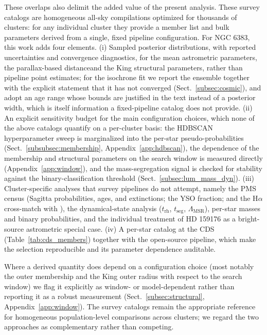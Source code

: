 \documentclass{aa}
\providecommand{\DIFaddtex}[1]{{\protect\color{red}\uwave{#1}}} %
\providecommand{\DIFaddbegin}{} %
\providecommand{\DIFaddend}{} %
\providecommand{\DIFadd}[1]{\texorpdfstring{\DIFaddtex{#1}}{#1}} %
\providecommand{\DIFaddincludegraphics}[2][]{{\color{blue}\fbox{\DIFOincludegraphics[#1]{#2}}}} %
\DeclareRobustCommand{\DIFaddbegin}{\DIFOaddbegin \let\includegraphics\DIFaddincludegraphics} %
\DeclareRobustCommand{\DIFaddend}{\DIFOaddend \let\includegraphics\DIFOincludegraphics} %
\begin{document}
These overlaps also delimit the added value of the present analysis. These survey catalogs are homogeneous all-sky compilations optimized for thousands of clusters: for any individual cluster they provide a member list and bulk parameters derived from a single, fixed pipeline configuration. For NGC 6383, this work adds four elements\@. (i) Sampled posterior distributions, with reported uncertainties and convergence diagnostics, for the mean astrometric parameters, the parallax-based distance\DIFaddbegin \DIFadd{, }\DIFaddend and the King structural parameters, rather than pipeline point estimates; for the isochrone fit we report the ensemble together with the explicit statement that it has not converged (Sect.~\ref{subsec:cosmic}), and adopt an age range whose bounds are justified in the text instead of a posterior width, which is itself information a fixed-pipeline catalog does not provide\@. (ii) An explicit sensitivity budget for the main configuration choices, which none of the above catalogs quantify on a per-cluster basis: the HDBSCAN hyperparameter sweep is marginalized into the per-star pseudo-probabilities (Sect.~\ref{subsubsec:membership}, Appendix~\ref{app:hdbscan}), the dependence of the membership and structural parameters on the search window is measured directly (Appendix~\ref{app:window}), and the mass-segregation signal is checked for stability against the binary-classification threshold (Sect.~\ref{subsec:lum_mass_dyn})\@. (iii) Cluster-specific analyses that survey pipelines do not attempt, namely the PMS census (Sagitta probabilities, ages, and extinctions; the YSO fraction; and the H$\alpha$ cross-match with \citealt{2010AA...511A..25R}), the dynamical-state analysis ($t_{\mathrm{rh}}$, $t_{\mathrm{seg}}$, $\Lambda_{\mathrm{MSR}}$), per-star masses and binary probabilities, and the individual treatment of HD 159176 as a bright-source astrometric special case\@. (iv) A per-star catalog at the CDS (Table~\ref{tab:cds_members}) together with the open-source pipeline, which make the selection reproducible and its parameter dependence auditable.

Where a derived quantity does depend on a configuration choice (most notably the outer membership and the King outer radius with respect to the search window) we flag it explicitly as window- or model-dependent rather than reporting it as a robust measurement (Sect.~\ref{subsec:structural}, Appendix~\ref{app:window}). The survey catalogs remain the appropriate reference for homogeneous population-level comparisons across clusters; we regard the two approaches as complementary rather than competing.
\end{document}
